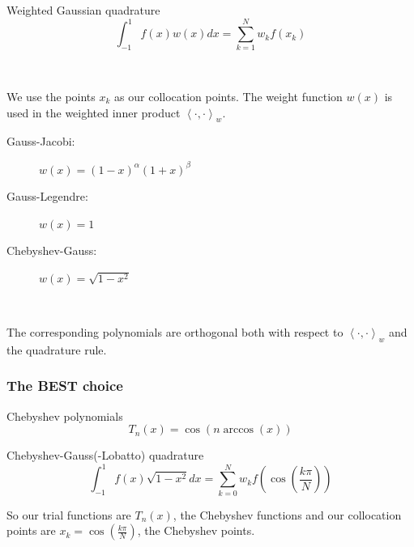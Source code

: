 \documentclass{beamer}
\newcommand{\inner}[2]{\left \langle #1, #2 \right \rangle}
\begin{document}
\begin{frame}

\begin{block}{Weighted Gaussian quadrature}
\begin{equation*}
\int_{-1}^1 f(x) w(x) dx = \sum_{k=1}^N w_k f(x_k)
\end{equation*}
\end{block}

~

We use the points $x_k$ as our collocation points.
The weight function $w(x)$ is used in the weighted inner product
$
\inner{\cdot}{\cdot}_w .
$

\end{frame}

\begin{frame}

\begin{description}
\item[Gauss-Jacobi:] $w(x) = (1-x)^\alpha (1+x)^\beta$
\item[Gauss-Legendre:] $w(x) = 1$
\item[Chebyshev-Gauss:] $w(x) = \sqrt{1-x^2}$
\end{description}

~

The corresponding polynomials are orthogonal both with respect to $\inner{\cdot}{\cdot}_w$ and the quadrature rule.

\end{frame}

\begin{frame}

\frametitle{The BEST choice}

\begin{block}{Chebyshev polynomials}
\begin{equation*}
T_n(x) = \cos \left ( n \arccos \left ( x \right ) \right )
\end{equation*}
\end{block}

\begin{block}{Chebyshev-Gauss(-Lobatto) quadrature}
\begin{equation*}
\int_{-1}^1 f(x) \sqrt{1-x^2} dx = \sum_{k=0}^N w_k f \left ( \cos \left ( \frac{ k \pi}{N} \right ) \right )
\end{equation*}
\end{block}

\end{frame}

\begin{frame}

So our trial functions are $T_n(x)$, the Chebyshev functions and our collocation points are $x_k = \cos \left ( \frac{k \pi}{N} \right )$, the Chebyshev points.


\end{frame}
\end{document}
